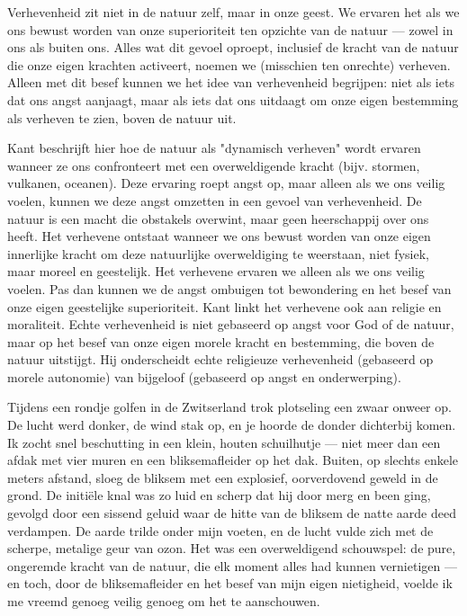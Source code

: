 \begin{mdframed}[leftmargin=0pt,rightmargin=0pt,backgroundcolor=blue!6,linecolor=white,innertopmargin=6pt,innerbottommargin=6pt]
Verhevenheid zit niet in de natuur zelf, maar in onze geest. We ervaren het als we ons bewust worden van onze superioriteit ten opzichte van de natuur — zowel in ons als buiten ons. Alles wat dit gevoel oproept, inclusief de kracht van de natuur die onze eigen krachten activeert, noemen we (misschien ten onrechte) verheven. Alleen met dit besef kunnen we het idee van verhevenheid begrijpen: niet als iets dat ons angst aanjaagt, maar als iets dat ons uitdaagt om onze eigen bestemming als verheven te zien, boven de natuur uit.

\bigskip
Kant beschrijft hier hoe de natuur als "dynamisch verheven" wordt ervaren wanneer ze ons confronteert met een overweldigende kracht (bijv. stormen, vulkanen, oceanen). Deze ervaring roept angst op, maar alleen als we ons veilig voelen, kunnen we deze angst omzetten in een gevoel van verhevenheid.
De natuur is een macht die obstakels overwint, maar geen heerschappij over ons heeft. Het verhevene ontstaat wanneer we ons bewust worden van onze eigen innerlijke kracht om deze natuurlijke overweldiging te weerstaan, niet fysiek, maar moreel en geestelijk.
Het verhevene ervaren we alleen als we ons veilig voelen. Pas dan kunnen we de angst ombuigen tot bewondering en het besef van onze eigen geestelijke superioriteit.
Kant linkt het verhevene ook aan religie en moraliteit. Echte verhevenheid is niet gebaseerd op angst voor God of de natuur, maar op het besef van onze eigen morele kracht en bestemming, die boven de natuur uitstijgt.
Hij onderscheidt echte religieuze verhevenheid (gebaseerd op morele autonomie) van bijgeloof (gebaseerd op angst en onderwerping).

Tijdens een rondje golfen in de Zwitserland trok plotseling een zwaar onweer op. De lucht werd donker, de wind stak op, en je hoorde de donder dichterbij komen. Ik zocht snel beschutting in een klein, houten schuilhutje — niet meer dan een afdak met vier muren en een bliksemafleider op het dak. Buiten, op slechts enkele meters afstand, sloeg de bliksem met een explosief, oorverdovend geweld in de grond. De initiële knal was zo luid en scherp dat hij door merg en been ging, gevolgd door een sissend geluid waar de hitte van de bliksem de natte aarde deed verdampen. De aarde trilde onder mijn voeten, en de lucht vulde zich met de scherpe, metalige geur van ozon. Het was een overweldigend schouwspel: de pure, ongeremde kracht van de natuur, die elk moment alles had kunnen vernietigen — en toch, door de bliksemafleider en het besef van mijn eigen nietigheid, voelde ik me vreemd genoeg veilig genoeg om het te aanschouwen.


\end{mdframed}
